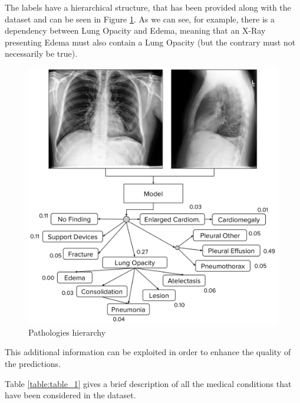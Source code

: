 \newpage
\noindent The labels have a hierarchical structure, that has been provided along with the dataset and can be seen in Figure \ref{fig:figure_3_1}. As we can see, for example, there is a dependency between Lung Opacity and Edema, meaning that an X-Ray presenting Edema must also contain a Lung Opacity (but the contrary must not necessarily be true). 

\begin{figure}[htbp!]
\centering
\includegraphics[scale=0.26]{Tesi/images/label_hierarchy}
\caption{Pathologies hierarchy}
\label{fig:figure_3_1}
\end{figure}

\noindent This additional information can be exploited in order to enhance the quality of the predictions.

\noindent Table \ref{table:table_1} gives a brief description of all the medical conditions that have been considered in the dataset. 

\newpage

